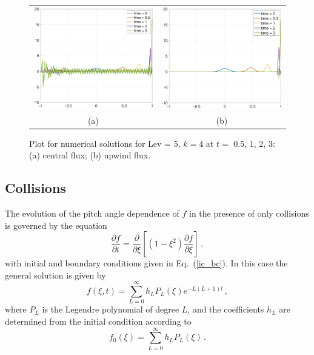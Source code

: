 \documentclass[preprint,11pt]{elsarticle}
\newcommand{\bq}{\begin{equation}}
\newcommand{\eq}{\end{equation}}
\begin{document}
\begin{figure}[H]
\begin{tabular}{cc}
  \includegraphics[width=.45\textwidth]{./NumFig/Test1-2-CF-L5D5}
  &\includegraphics[width=.45\textwidth]{./NumFig/Test1-2-UF-L5D5}\\
  (a) & (b)
  \end{tabular}
  \caption{Plot for numerical solutions for Lev = 5, $k = 4$ at $t = $ 0.5, 1, 2, 3: (a) central flux; (b) upwind flux.}\label{Fig:Pitch_E_2-Num2}
\end{figure}



\subsection{Collisions}\label{SubSect:Pitch-2}
The evolution of the pitch angle dependence of $f$ in the presence of only collisions is governed by the equation
\bq
\label{pitch_Coll_eq}
\frac{\partial f}{\partial t}= \frac{\partial}{\partial\xi} \left[ \left(1-\xi^2\right) \frac{\partial f}{\partial \xi} \right] \, ,
\eq
with initial and boundary conditions given in Eq.~(\ref{ic_bc}).
In this case the general solution is given by 
\bq
\label{pitch_Coll_sol}
 f(\xi, t)=\sum_{L=0}^\infty h_L P_L(\xi) e^{-L(L+1) t}\, ,
 \eq
where $P_L$ is the Legendre polynomial of degree $L$, and the coefficients $h_L$ are determined from the initial condition according to
\bq
\label{pitch_Coll_ic}
 f_0(\xi)=\sum_{L=0}^\infty h_L P_L(\xi)\, .
 \eq
 
\end{document}
